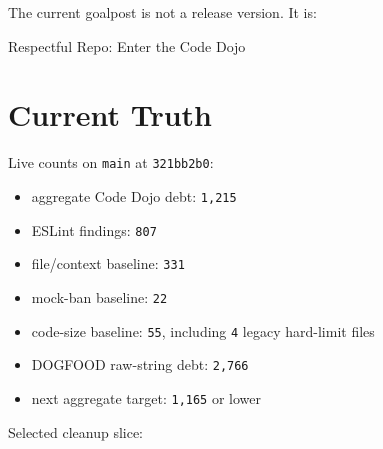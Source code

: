 The current goalpost is not a release version. It is:

\begin{CodeBlock}
Respectful Repo: Enter the Code Dojo
\end{CodeBlock}

\section{Current Truth}\label{record-232-current-truth}

Live counts on \texttt{m\allowbreak{}a\allowbreak{}i\allowbreak{}n} at \texttt{3\allowbreak{}2\allowbreak{}1\allowbreak{}b\allowbreak{}b\allowbreak{}2\allowbreak{}b\allowbreak{}0}:

\begin{itemize}
\tightlist
\item
  aggregate Code Dojo debt: \texttt{1\allowbreak{},\allowbreak{}2\allowbreak{}1\allowbreak{}5}
\item
  ESLint findings: \texttt{8\allowbreak{}0\allowbreak{}7}
\item
  file/context baseline: \texttt{3\allowbreak{}3\allowbreak{}1}
\item
  mock-ban baseline: \texttt{2\allowbreak{}2}
\item
  code-size baseline: \texttt{5\allowbreak{}5}, including \texttt{4} legacy hard-limit files
\item
  DOGFOOD raw-string debt: \texttt{2\allowbreak{},\allowbreak{}7\allowbreak{}6\allowbreak{}6}
\item
  next aggregate target: \texttt{1\allowbreak{},\allowbreak{}1\allowbreak{}6\allowbreak{}5} or lower
\end{itemize}

Selected cleanup slice:

